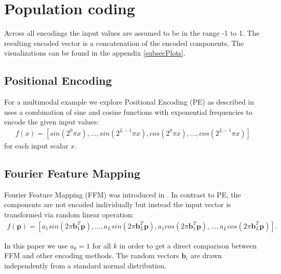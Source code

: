 \section{Population coding}
Across all encodings the input values are assumed to be in the range -1 to 1. 
The resulting encoded vector is a concatenation of the encoded components. The visualizations can be found in the appendix \ref{subsecPlots}.

\subsection{Positional Encoding}
For a multimodal example we explore Positional Encoding (PE) as described in \cite{mildenhall2020nerf} uses a combination of sine and cosine functions with exponential frequencies to encode the given input values:
\begin{align*}
    f(x) = [sin(2^0\pi x),\ldots,sin(2^{L-1}\pi x),cos(2^0\pi x),\ldots,cos(2^{L-1}\pi x)]
\end{align*}
for each input scalar $x$. 

\subsection{Fourier Feature Mapping}
Fourier Feature Mapping (FFM) was introduced in \cite{tancik2020fourier}. In contrast to PE, the components are not encoded individually but instead the input vector is transformed via random linear operation:
\begin{align*}
    f(\textbf{p}) = [a_1 sin(2\pi\textbf{b}_1^T\textbf{p}),\ldots,a_L sin(2\pi\textbf{b}_L^T\textbf{p}),a_1 cos(2\pi\textbf{b}_1^T\textbf{p}),\ldots,a_L cos(2\pi \textbf{b}_L^T\textbf{p})].
\end{align*}

In this paper we use $a_k=1$ for all $k$ in order to get a direct comparison between FFM and other encoding methods. The random vectors $\textbf{b}_i$ are drawn independently from a standard normal distribution.

